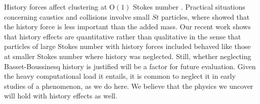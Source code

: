 \documentclass[../Rajarshi-thesis-draft.tex]{subfiles}
\begin{document}
  History forces affect clustering at O$(1)$ Stokes number \cite{olivieri2014, daitche2015}. Practical situations concerning caustics and collisions involve small $St$ particles, where \citet{ferry2001} showed that the history force is less important than the added mass. Our recent work \cite{kapoor2024} shows that history effects are quantitative rather than qualitative in the sense that particles of large Stokes number with history forces included behaved like those at smaller Stokes number where history was neglected. Still, whether neglecting Basset-Boussinesq history is justified will be a factor for future evaluation. Given the heavy computational load it entails, it is common to neglect it in early studies of a phenomenon, as we do here. We believe that the physics we uncover will hold with history effects as well.
\end{document}
